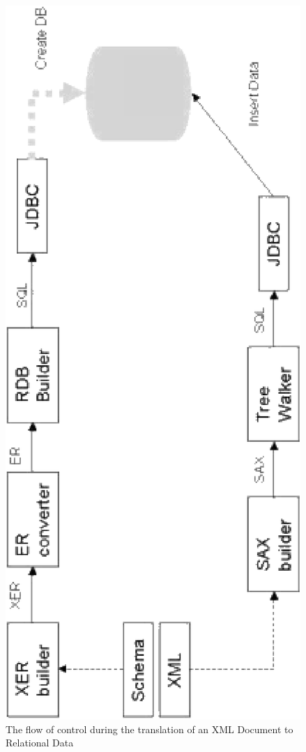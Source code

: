 \documentclass[a4paper]{article}
\begin{document}
\begin{figure}
\begin{center}
\includegraphics[angle=270,scale=0.5]{control-flow.eps}
\caption{The flow of control during the translation of an XML Document to Relational Data}
\label{control_flow}
\end{center}
\end{figure}
\end{document}
